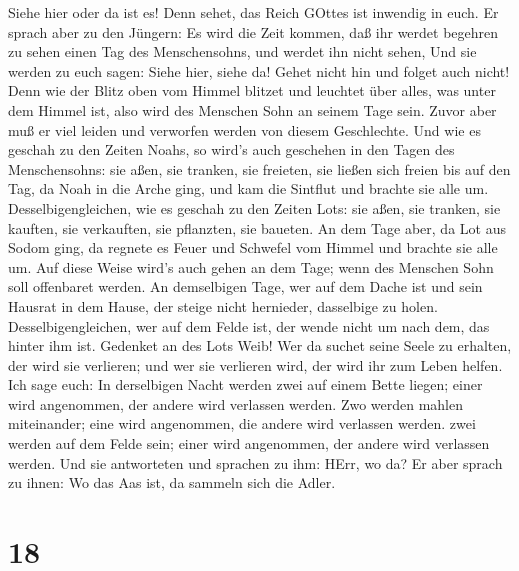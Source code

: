 Siehe hier oder da ist es! Denn sehet, das Reich GOttes ist inwendig in
euch.  Er sprach aber zu den Jüngern: Es wird die Zeit
kommen, daß ihr werdet begehren zu sehen einen Tag des Menschensohns,
und werdet ihn nicht sehen,  Und sie werden zu euch sagen:
Siehe hier, siehe da! Gehet nicht hin und folget auch nicht!
 Denn wie der Blitz oben vom Himmel blitzet und leuchtet
über alles, was unter dem Himmel ist, also wird des Menschen Sohn an
seinem Tage sein.  Zuvor aber muß er viel leiden und
verworfen werden von diesem Geschlechte.  Und wie es
geschah zu den Zeiten Noahs, so wird's auch geschehen in den Tagen des
Menschensohns:  sie aßen, sie tranken, sie freieten, sie
ließen sich freien bis auf den Tag, da Noah in die Arche ging, und kam
die Sintflut und brachte sie alle um.  Desselbigengleichen,
wie es geschah zu den Zeiten Lots: sie aßen, sie tranken, sie kauften,
sie verkauften, sie pflanzten, sie baueten.  An dem Tage
aber, da Lot aus Sodom ging, da regnete es Feuer und Schwefel vom Himmel
und brachte sie alle um.  Auf diese Weise wird's auch gehen
an dem Tage; wenn des Menschen Sohn soll offenbaret werden.
 An demselbigen Tage, wer auf dem Dache ist und sein
Hausrat in dem Hause, der steige nicht hernieder, dasselbige zu holen.
Desselbigengleichen, wer auf dem Felde ist, der wende nicht um nach dem,
das hinter ihm ist.  Gedenket an des Lots Weib!
 Wer da suchet seine Seele zu erhalten, der wird sie
verlieren; und wer sie verlieren wird, der wird ihr zum Leben helfen.
 Ich sage euch: In derselbigen Nacht werden zwei auf einem
Bette liegen; einer wird angenommen, der andere wird verlassen werden.
 Zwo werden mahlen miteinander; eine wird angenommen, die
andere wird verlassen werden.  zwei werden auf dem Felde
sein; einer wird angenommen, der andere wird verlassen werden.
 Und sie antworteten und sprachen zu ihm: HErr, wo da? Er
aber sprach zu ihnen: Wo das Aas ist, da sammeln sich die Adler.

\hypertarget{section-17}{%
\section{18}\label{section-17}}

